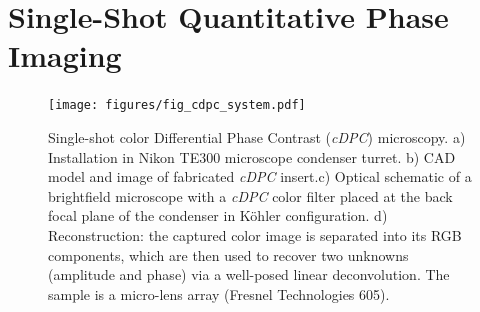 %
%

\section{Single-Shot Quantitative Phase Imaging}\label{sec:phase:cdpc}

\begin{figure}[tbh]
\centering
\texttt{[image: figures/fig\_cdpc\_system.pdf]}
\caption{\label{fig:dpc_cdpchardware}
Single-shot color Differential Phase Contrast (\textit{cDPC}) microscopy. a) Installation in Nikon TE300 microscope condenser turret. b) CAD model and image of fabricated \textit{cDPC} insert.c) Optical schematic of a brightfield microscope with a \textit{cDPC} color filter placed at the back focal plane of the condenser in K\"{o}hler configuration. d) Reconstruction: the captured color image is separated into its RGB components, which are then used to recover two unknowns (amplitude and phase) via a well-posed linear deconvolution. The sample is a micro-lens array (Fresnel Technologies 605). }
\end{figure}

